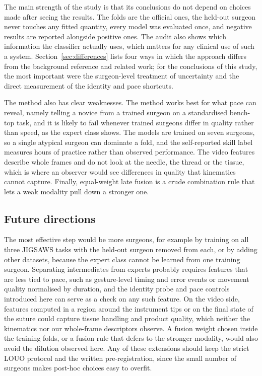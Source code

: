 The main strength of the study is that its conclusions do not depend on choices made after seeing the results. The folds are the official ones, the held-out surgeon never touches any fitted quantity, every model was evaluated once, and negative results are reported alongside positive ones. The audit also shows which information the classifier actually uses, which matters for any clinical use of such a system. Section~\ref{sec:differences} lists four ways in which the approach differs from the background reference and related work; for the conclusions of this study, the most important were the surgeon-level treatment of uncertainty and the direct measurement of the identity and pace shortcuts.

The method also has clear weaknesses. The method works best for what pace can reveal, namely telling a novice from a trained surgeon on a standardised bench-top task, and it is likely to fail whenever trained surgeons differ in quality rather than speed, as the expert class shows. The models are trained on seven surgeons, so a single atypical surgeon can dominate a fold, and the self-reported skill label measures hours of practice rather than observed performance. The video features describe whole frames and do not look at the needle, the thread or the tissue, which is where an observer would see differences in quality that kinematics cannot capture. Finally, equal-weight late fusion is a crude combination rule that lets a weak modality pull down a stronger one.

\subsection{Future directions}

The most effective step would be more surgeons, for example by training on all three JIGSAWS tasks with the held-out surgeon removed from each, or by adding other datasets, because the expert class cannot be learned from one training surgeon. Separating intermediates from experts probably requires features that are less tied to pace, such as gesture-level timing and error events or movement quality normalised by duration, and the identity probe and pace controls introduced here can serve as a check on any such feature. On the video side, features computed in a region around the instrument tips or on the final state of the suture could capture tissue handling and product quality, which neither the kinematics nor our whole-frame descriptors observe. A fusion weight chosen inside the training folds, or a fusion rule that defers to the stronger modality, would also avoid the dilution observed here. Any of these extensions should keep the strict LOUO protocol and the written pre-registration, since the small number of surgeons makes post-hoc choices easy to overfit.


